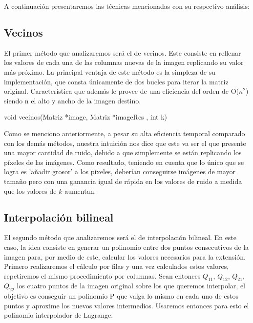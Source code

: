 A continuación presentaremos las técnicas mencionadas con su respectivo análisis:

\subsection{Vecinos}
El primer método que analizaremos será el de vecinos. Este consiste en rellenar los valores de cada una de las columnas
nuevas de la imagen replicando su valor más próximo. La principal ventaja de este método es la simpleza de su implementación, que consta únicamente de dos bucles para iterar la matriz original. Característica que además le provee de una eficiencia del orden de O($n^2$) siendo n el alto y ancho de la imagen destino.

\begin{algorithm}
\begin{algorithmic}[1]\parskip=1mm
\caption{void vecinos(Matriz *image, Matriz *imageRes , int k)}
    \ENDFOR
\ENDFOR
\end{algorithmic}
\end{algorithm}

Como se menciono anteriormente, a pesar su alta eficiencia temporal comparado con los demás métodos, nuestra intuición nos dice que este va ser el que presente una mayor cantidad de ruido, debido a que simplemente se están replicando los píxeles de las imágenes. Como resultado, teniendo en cuenta que lo único que se logra es 'añadir grosor' a los píxeles, deberían conseguirse imágenes de mayor tamaño pero con una ganancia igual de rápida en los valores de ruido a medida que los valores de $k$ aumentan.

\subsection{Interpolación bilineal}
El segundo método que analizaremos será el de interpolación bilineal. En este caso, la idea consiste en generar un polinomio entre
dos puntos consecutivos de la imagen para, por medio de este, calcular los valores necesarios para la extensión. \\
Primero realizaremos el cálculo por filas y una vez calculados estos valores, repetiremos el mismo procedimiento por columnas.
Sean entonces $Q_{11}$, $Q_{12}$, $Q_{21}$, $Q_{22}$ los cuatro puntos de la imagen original sobre los que queremos interpolar, el objetivo es conseguir un polinomio P que valga lo mismo en cada uno de estos puntos y aproxime los nuevos valores intermedios. Usaremos entonces para esto el polinomio interpolador de Lagrange.

